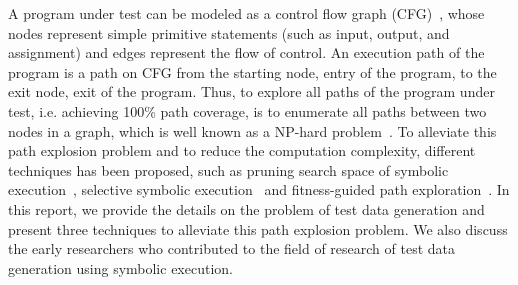 A program under test can be modeled as a control flow graph (CFG)~\cite{testbook}, whose nodes represent simple primitive statements (such as input, output, and assignment) and edges represent the flow of control. An execution path of the program is a path on CFG from the starting node, entry of the program, to the exit node, exit of the program. Thus, to explore all paths of the program under test, i.e. achieving 100\% path coverage, is to enumerate all paths between two nodes in a graph, which is well known as a NP-hard problem~\cite{graph}. To alleviate this path explosion problem and to reduce the computation complexity, different techniques has been proposed, such as pruning search space of symbolic execution~\cite{prune}, selective symbolic execution~\cite{selective} and fitness-guided path exploration~\cite{fitness}. In this report, we provide the details on the problem of test data generation and present three techniques to alleviate this path explosion problem. We also discuss the early researchers who contributed to the field of research of test data generation using symbolic execution. 